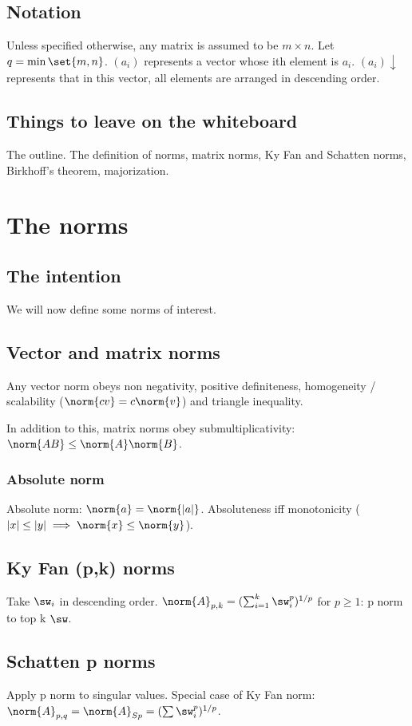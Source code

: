\documentclass[10pt]{amsart}
\begin{document}
\subsection{Notation}
Unless specified otherwise, any matrix is assumed to be $m \times n$. Let $q = \min \set{m,n}$. $(a_{i})$ represents a vector whose ith element is $a_{i}$. $(a_{i}) \downarrow$ represents that in this vector, all elements are arranged in descending order.

\subsection{Things to leave on the whiteboard}
The outline. The definition of norms, matrix norms, Ky Fan and Schatten norms, Birkhoff's theorem, majorization.

\section{The norms}
\subsection{The intention}
We will now define some norms of interest.

\subsection{Vector and matrix norms}
Any vector norm obeys non negativity, positive definiteness, homogeneity / scalability ($\norm{cv} = c\norm{v}$) and triangle inequality.

In addition to this, matrix norms obey submultiplicativity: $\norm{AB} \leq \norm{A} \norm{B}$.

\subsubsection{Absolute norm}
Absolute norm: $\norm{a} = \norm{|a|}$. Absoluteness iff monotonicity ($|x|\leq |y| \implies \norm{x} \leq \norm{y}$).

\subsection{Ky Fan (p,k) norms}
Take $\sw_{i}$ in descending order. $\norm{A}_{p,k} = (\sum_{i=1}^{k}\sw_{i}^{p})^{1/p} $ for $p\geq 1$: p norm to top k $\sw$.

\subsection{Schatten p norms}
Apply p norm to singular values. Special case of Ky Fan norm: $\norm{A}_{p,q}  = \norm{A}_{Sp} = (\sum \sw_{i}^{p})^{1/p}$.
\end{document}
